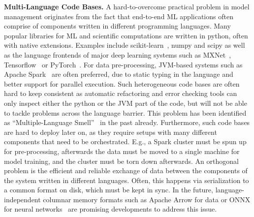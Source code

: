 \documentclass[11pt]{article}
\newcommand{\hdr}[1]{\noindent\textbf{#1.}}
\begin{document}
\hdr{Multi-Language Code Bases} A hard-to-overcome practical problem in model management originates from the fact that end-to-end ML applications often comprise of components written in different programming languages. Many popular libraries for ML and scientific computations are written in python, often with native extensions. Examples include scikit-learn~\cite{Pedregosa2011}, numpy and scipy as well as the language frontends of major deep learning systems such as MXNet~\cite{Chen2015}, Tensorflow~\cite{Abadi2016} or PyTorch~\cite{Paszke2017}. For data pre-processing, JVM-based systems such as Apache Spark~\cite{Zaharia2012} are often preferred, due to static typing in the language and better support for parallel execution. Such heterogeneous code bases are often hard to keep consistent as automatic refactoring and error checking tools can only inspect either the python or the JVM part of the code, but will not be able to tackle problems across the language barrier. This problem has been identified as ``Multiple-Language Smell''~\cite{Sculley2015} in the past already. Furthermore, such code bases are hard to deploy later on, as they require setups with many different components that need to be orchestrated. E.g., a Spark cluster must be spun up for pre-processing, afterwards the data must be moved to a single machine for model training, and the cluster must be torn down afterwards. An orthogonal problem is the efficient and reliable exchange of data between the components of the system written in different languages. Often, this happens via serialization to a common format on disk, which must be kept in sync. In the future, language-independent columnar memory formats such as Apache Arrow for data or ONNX for neural networks~\cite{ONNX} are promising developments to address this issue.\\
\end{document}
